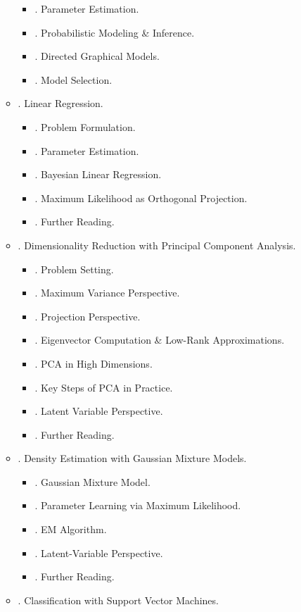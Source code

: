 \documentclass{article}
\begin{document}
\begin{enumerate}
\begin{itemize}
\begin{itemize}
			\item {. Parameter Estimation.}
			\item {. Probabilistic Modeling \& Inference.}
			\item {. Directed Graphical Models.}
			\item {. Model Selection.}
		\end{itemize}
		\item {. Linear Regression.}
		\begin{itemize}
			\item {. Problem Formulation.}
			\item {. Parameter Estimation.}
			\item {. Bayesian Linear Regression.}
			\item {. Maximum Likelihood as Orthogonal Projection.}
			\item {. Further Reading.}
		\end{itemize}
		\item {. Dimensionality Reduction with Principal Component Analysis.}
		\begin{itemize}
			\item {. Problem Setting.}
			\item {. Maximum Variance Perspective.}
			\item {. Projection Perspective.}
			\item {. Eigenvector Computation \& Low-Rank Approximations.}
			\item {. PCA in High Dimensions.}
			\item {. Key Steps of PCA in Practice.}
			\item {. Latent Variable Perspective.}
			\item {. Further Reading.}
		\end{itemize}
		\item {. Density Estimation with Gaussian Mixture Models.}
		\begin{itemize}
			\item {. Gaussian Mixture Model.}
			\item {. Parameter Learning via Maximum Likelihood.}
			\item {. EM Algorithm.}
			\item {. Latent-Variable Perspective.}
			\item {. Further Reading.}
		\end{itemize}
		\item {. Classification with Support Vector Machines.}

\end{itemize}
\end{enumerate}
\end{document}

